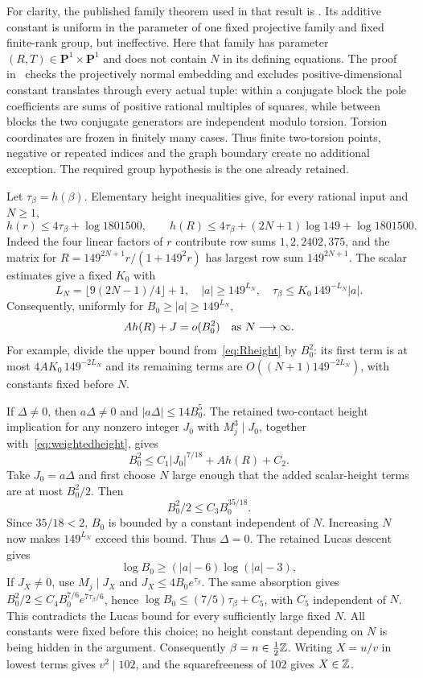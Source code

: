 \documentclass[11pt]{article}
\theoremstyle{remark}\newtheorem{remark}[theorem]{Remark}
\begin{document}
For clarity, the published family theorem used in that result is
\cite[Theorem 1.1, p.~308]{VB}. Its additive constant is uniform
in the parameter of one fixed projective family and fixed
finite-rank group, but ineffective. Here that family has parameter
$(R,T)\in\mathbf P^1\times\mathbf P^1$ and does not contain $N$
in its defining equations. The proof in~\cite{Weighted} checks
the projectively normal embedding and excludes positive-dimensional
constant translates through every actual tuple: within a conjugate
block the pole coefficients are sums of positive rational multiples
of squares, while between blocks the two conjugate generators are
independent modulo torsion. Torsion coordinates are frozen in
finitely many cases. Thus finite two-torsion points, negative or
repeated indices and the graph boundary create no additional
exception. The required group hypothesis is the one already retained.

Let $\tau_\beta=h(\beta)$. Elementary height inequalities give,
for every rational input and $N\ge1$,
\begin{equation}\label{eq:Rheight}
 h(r)\le4\tau_\beta+\log1801500,\qquad
 h(R)\le4\tau_\beta+(2N+1)\log149+\log1801500.
\end{equation}
Indeed the four linear factors of $r$ contribute row sums
$1,2,2402,375$, and the matrix for
$R=149^{2N+1}r/(1+149^2r)$ has largest row sum
$149^{2N+1}$. The scalar estimates give a fixed $K_0$ with
\[
 L_N=\lfloor9(2N-1)/4\rfloor+1,\quad
 |a|\ge149^{L_N},\quad
 \tau_\beta\le K_0\,149^{-L_N}|a|.
\]
Consequently, uniformly for $B_0\ge|a|\ge149^{L_N}$,
\[
 A h(R)+J= o(B_0^2)\quad\hbox{as }N\longrightarrow\infty.
\]
For example, divide the upper bound from~\eqref{eq:Rheight}
by $B_0^2$: its first term is at most
$4AK_0\,149^{-2L_N}$ and its remaining terms are
$O((N+1)149^{-2L_N})$, with constants fixed before $N$.

If $\Delta\ne0$, then $a\Delta\ne0$ and
$|a\Delta|\le14B_0^5$. The retained two-contact height implication
for any nonzero integer $J_0$ with $M_j^3\mid J_0$, together
with~\eqref{eq:weightedheight}, gives
\[
 B_0^2\le C_1|J_0|^{7/18}+A h(R)+C_2.
\]
Take $J_0=a\Delta$ and first choose $N$ large enough that the
added scalar-height terms are at most $B_0^2/2$. Then
\[
                     B_0^2/2\le C_3B_0^{35/18}.
\]
Since $35/18<2$, $B_0$ is bounded by a constant independent of
$N$. Increasing $N$ now makes $149^{L_N}$ exceed this bound. Thus
$\Delta=0$. The retained Lucas descent gives
\[
 \log B_0\ge(|a|-6)\log(|a|-3),
\]
If $J_X\ne0$, use $M_j\mid J_X$ and
$J_X\le4B_0e^{\tau_\beta}$. The same absorption gives
$B_0^2/2\le C_4B_0^{7/6}e^{7\tau_\beta/6}$, hence
$\log B_0\le(7/5)\tau_\beta+C_5$, with $C_5$ independent of
$N$. This contradicts the Lucas bound for every sufficiently
large fixed $N$. All constants were fixed before this choice;
no height constant depending on $N$ is being hidden in the argument.
Consequently
$\beta=n\in\frac12\mathbb Z$. Writing $X=u/v$ in lowest terms gives
$v^2\mid102$, and the squarefreeness of 102 gives $X\in\mathbb Z$.
\end{document}
